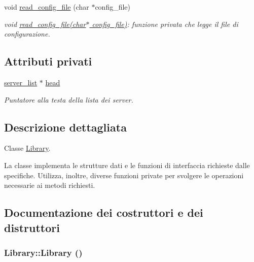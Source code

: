 \begin{CompactItemize}
void \hyperlink{classLibrary_e64f3f91067ea280395d09420d961901_e64f3f91067ea280395d09420d961901}{read\_\-config\_\-file} (char $\ast$config\_\-file)
\begin{CompactList}\small\item\em void \hyperlink{classLibrary_e64f3f91067ea280395d09420d961901_e64f3f91067ea280395d09420d961901}{read\_\-config\_\-file(char$\ast$ config\_\-file)}: funzione privata che legge il file di configurazione. \item\end{CompactList}\end{CompactItemize}
\subsection*{Attributi privati}
\begin{CompactItemize}
\item 
\hyperlink{structserver__list}{server\_\-list} $\ast$ \hyperlink{classLibrary_eced31f89cfa5a81b832dddfe84c43f7_eced31f89cfa5a81b832dddfe84c43f7}{head}
\begin{CompactList}\small\item\em Puntatore alla testa della lista dei server. \item\end{CompactList}\end{CompactItemize}


\subsection{Descrizione dettagliata}
Classe \hyperlink{classLibrary}{Library}. 

La classe implementa le strutture dati e le funzioni di interfaccia richieste dalle specifiche. Utilizza, inoltre, diverse funzioni private per svolgere le operazioni necessarie ai metodi richiesti. 

\subsection{Documentazione dei costruttori e dei distruttori}
\hypertarget{classLibrary_82338219d8bf51962ff5f60a0db21b19_82338219d8bf51962ff5f60a0db21b19}{
\subsubsection[{Library}]{\setlength{\rightskip}{0pt plus 5cm}Library::Library ()}}
\label{classLibrary_82338219d8bf51962ff5f60a0db21b19_82338219d8bf51962ff5f60a0db21b19}


